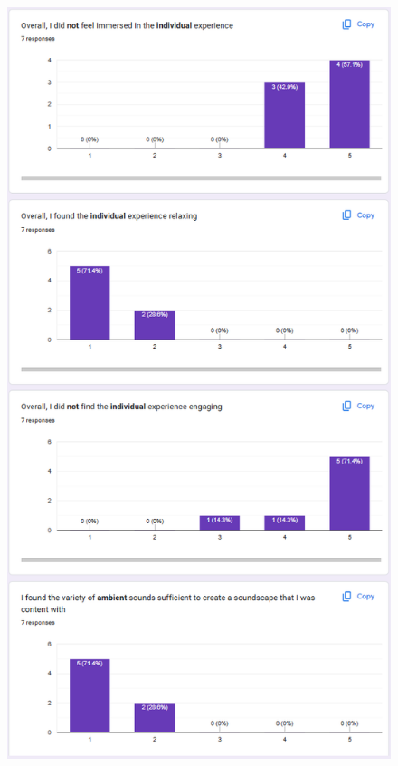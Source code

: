 \begin{appendices}
\begin{figure}[htb]
\end{figure}
\begin{figure}[htb]
    \centering
    \includegraphics[width=0.8\linewidth]{images/survey-results/6.png}    
\end{figure}
\begin{figure}[htb]
    \centering

\end{figure}
\end{appendices}
